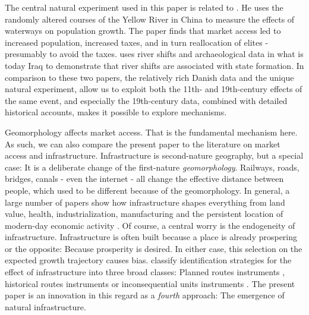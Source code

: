 \documentclass[11pt]{article}
\begin{document}
The central natural experiment used in this paper is related to \citep{Seror2020Random}. He uses the randomly altered courses of the Yellow River in China to measure the effects of waterways on population growth. The paper finds that market access led to increased population, increased taxes, and in turn reallocation of elites - presumably to avoid the taxes. \citep{Allen2023} uses river shifts and archaeological data in what is today Iraq to demonstrate that river shifts are associated with state formation. In comparison to these two papers, the relatively rich Danish data and the unique natural experiment, allow us to exploit both the 11th- and 19th-century effects of the same event, and especially the 19th-century data, combined with detailed historical accounts, makes it possible to explore mechanisms. 

Geomorphology affects market access. That is the fundamental mechanism here. As such, we can also compare the present paper to the literature on market access and infrastructure. Infrastructure is second-nature geography, but a special case: It is a deliberate change of the first-nature \textit{geomorphology}. Railways, roads, bridges, canals - even the internet - all change the effective distance between people, which used to be different because of the geomorphology. In general, a large number of papers show how infrastructure shapes everything from land value, health, industrialization, manufacturing and the persistent location of modern-day economic activity \citep{Donaldson2016, Berger2017, Berger2019a, Hornbeck2019, Bogart2019, Zimran2020a, Bogart2022, Hornbeck2024, Hornung2015}. Of course, a central worry is the endogeneity of infrastructure. Infrastructure is often built because a place is already prospering or the opposite: Because prosperity is desired. In either case, this selection on the expected growth trajectory causes bias. \cite{Redding2015} classify identification strategies for the effect of infrastructure into three broad classes: Planned routes instruments \citep{BaumSnow2007}, historical routes instruments \citep{Duranton2012} or inconsequential units instruments \citep{Berger2017}. The present paper is an innovation in this regard as a \textit{fourth} approach: The emergence of natural infrastructure.
\end{document}

